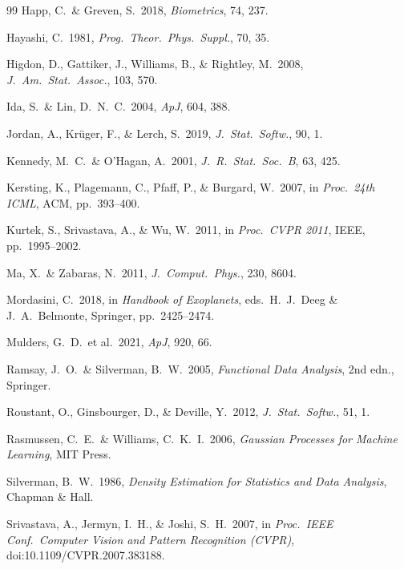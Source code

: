 \documentclass[12pt,a4paper]{article}
\begin{document}
\begin{thebibliography}{99}
Happ, C.\ \& Greven, S.\ 2018, \textit{Biometrics}, 74, 237.

Hayashi, C.\ 1981, \textit{Prog.\ Theor.\ Phys.\ Suppl.}, 70, 35.

Higdon, D., Gattiker, J., Williams, B., \& Rightley, M.\ 2008,
\textit{J.\ Am.\ Stat.\ Assoc.}, 103, 570.

Ida, S.\ \& Lin, D.~N.~C.\ 2004, \textit{ApJ}, 604, 388.

Jordan, A., Kr\"uger, F., \& Lerch, S.\ 2019,
\textit{J.\ Stat.\ Softw.}, 90, 1.

Kennedy, M.~C.\ \& O'Hagan, A.\ 2001,
\textit{J.\ R.\ Stat.\ Soc.\ B}, 63, 425.

Kersting, K., Plagemann, C., Pfaff, P., \& Burgard, W.\ 2007,
in \textit{Proc.\ 24th ICML}, ACM, pp.\ 393--400.

Kurtek, S., Srivastava, A., \& Wu, W.\ 2011,
in \textit{Proc.\ CVPR 2011}, IEEE, pp.\ 1995--2002.

Ma, X.\ \& Zabaras, N.\ 2011, \textit{J.\ Comput.\ Phys.}, 230, 8604.

Mordasini, C.\ 2018, in \textit{Handbook of Exoplanets},
eds.\ H.~J.\ Deeg \& J.~A.\ Belmonte, Springer, pp.\ 2425--2474.

Mulders, G.~D.\ et al.\ 2021, \textit{ApJ}, 920, 66.

Ramsay, J.~O.\ \& Silverman, B.~W.\ 2005,
\textit{Functional Data Analysis}, 2nd edn., Springer.

Roustant, O., Ginsbourger, D., \& Deville, Y.\ 2012,
\textit{J.\ Stat.\ Softw.}, 51, 1.

Rasmussen, C.~E.\ \& Williams, C.~K.~I.\ 2006,
\textit{Gaussian Processes for Machine Learning}, MIT Press.

Silverman, B.~W.\ 1986,
\textit{Density Estimation for Statistics and Data Analysis},
Chapman \& Hall.

Srivastava, A., Jermyn, I.~H., \& Joshi, S.~H.\ 2007,
in \textit{Proc.\ IEEE Conf.\ Computer Vision and Pattern Recognition
(CVPR)}, doi:10.1109/CVPR.2007.383188.


\end{thebibliography}
\end{document}

